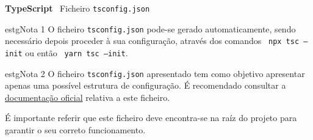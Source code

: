 \label{tsconfigExample}

\begin{longlisting}
	\inputminted{json}{code/typescript/tsconfig.json}
	\caption{\textbf{TypeScript} \textemdash~Ficheiro \texttt{tsconfig.json}}
\end{longlisting}

\begin{mybox}{estg}{Nota 1}
	O ficheiro \texttt{tsconfig.json} pode-se gerado automaticamente, sendo necessário depois proceder à sua configuração, através dos comandos ~\texttt{npx tsc --init} ou então ~\texttt{yarn tsc --init}.
\end{mybox}

\begin{mybox}{estg}{Nota 2}
	O ficheiro \texttt{tsconfig.json} apresentado tem como objetivo apresentar apenas uma possível estrutura de configuração. É recomendado consultar a \href{https://www.typescriptlang.org/tsconfig}{documentação oficial} relativa a este ficheiro.

	\vspace{0.15cm}

	É importante referir que este ficheiro deve encontra-se na raíz do projeto para garantir o seu correto funcionamento.
\end{mybox}